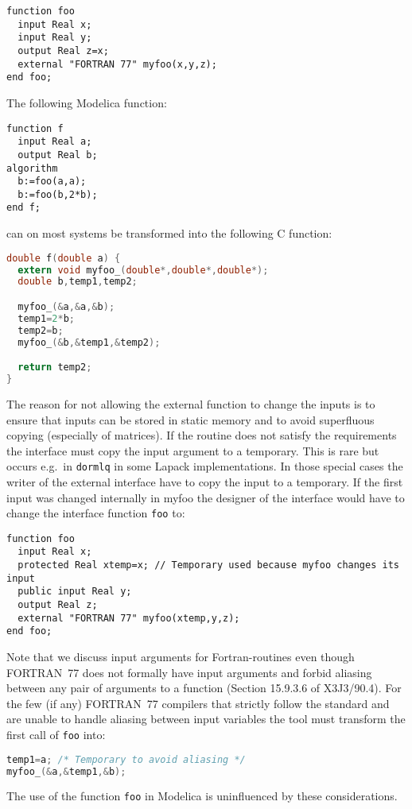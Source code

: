 \begin{example}
\begin{lstlisting}[language=modelica]
function foo
  input Real x;
  input Real y;
  output Real z=x;
  external "FORTRAN 77" myfoo(x,y,z);
end foo;
\end{lstlisting}
The following Modelica function:
\begin{lstlisting}[language=modelica]
function f
  input Real a;
  output Real b;
algorithm
  b:=foo(a,a);
  b:=foo(b,2*b);
end f;
\end{lstlisting}
can on most systems be transformed into the following C function:
\begin{lstlisting}[language=C]
double f(double a) {
  extern void myfoo_(double*,double*,double*);
  double b,temp1,temp2;

  myfoo_(&a,&a,&b);
  temp1=2*b;
  temp2=b;
  myfoo_(&b,&temp1,&temp2);

  return temp2;
}
\end{lstlisting}

The reason for not allowing the external function to change the
inputs is to ensure that inputs can be stored in static memory and to
avoid superfluous copying (especially of matrices). If the routine does
not satisfy the requirements the interface must copy the input argument
to a temporary. This is rare but occurs e.g.\ in \lstinline!dormlq! in some
Lapack implementations. In those special cases the writer of the
external interface have to copy the input to a temporary. If the first
input was changed internally in myfoo the designer of the interface
would have to change the interface function \lstinline!foo! to:
\begin{lstlisting}[language=modelica]
function foo
  input Real x;
  protected Real xtemp=x; // Temporary used because myfoo changes its input
  public input Real y;
  output Real z;
  external "FORTRAN 77" myfoo(xtemp,y,z);
end foo;
\end{lstlisting}

Note that we discuss input arguments for Fortran-routines even
though FORTRAN~77 does not formally have input arguments and forbid
aliasing between any pair of arguments to a function (Section 15.9.3.6
of X3J3/90.4). For the few (if any) FORTRAN~77 compilers that strictly
follow the standard and are unable to handle aliasing between input
variables the tool must transform the first call of \lstinline!foo! into:
\begin{lstlisting}[language=C]
temp1=a; /* Temporary to avoid aliasing */
myfoo_(&a,&temp1,&b);
\end{lstlisting}

The use of the function \lstinline!foo! in Modelica is uninfluenced by these considerations.
\end{example}

